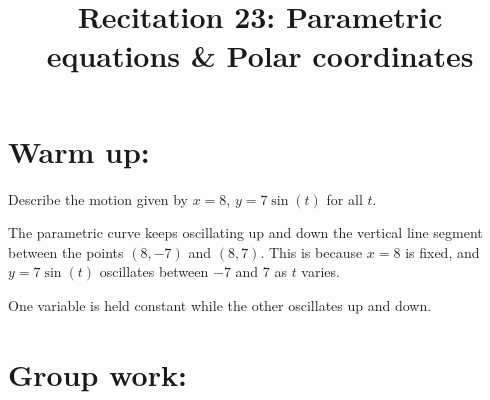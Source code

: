 \documentclass[handout]{ximera}
\title{Recitation 23: Parametric equations \& Polar coordinates}
\begin{document}
\begin{abstract}		\end{abstract}
\maketitle




\section{Warm up:}
Describe the motion given by $x=8$, $y=7 \sin (t)$ for all $t$.
	\begin{freeResponse}
	The parametric curve keeps oscillating up and down the vertical line segment between the points $(8,-7)$ and $(8,7)$.
	This is because $x=8$ is fixed, and $y = 7 \sin(t)$ oscillates between $-7$ and $7$ as $t$ varies.
	\end{freeResponse}
	
\begin{instructorNotes}
One variable is held constant while the other oscillates up and down.
\end{instructorNotes}







\section{Group work:}
\end{document}
